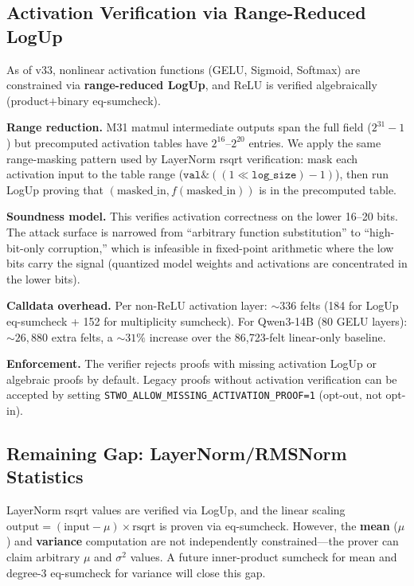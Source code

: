 \documentclass[10pt,twocolumn]{article}
\theoremstyle{definition}
\theoremstyle{remark}
\begin{document}
\subsection{Activation Verification via Range-Reduced LogUp}

As of v33, nonlinear activation functions (GELU, Sigmoid, Softmax)
are constrained via \textbf{range-reduced LogUp}, and ReLU is
verified algebraically (product$+$binary eq-sumcheck).

\textbf{Range reduction.}
M31 matmul intermediate outputs span the full field ($2^{31}\!-\!1$)
but precomputed activation tables have $2^{16}$--$2^{20}$ entries.
We apply the same range-masking pattern used by LayerNorm rsqrt
verification: mask each activation input to the table range
($\texttt{val} \mathbin{\&} ((1 \ll \texttt{log\_size}) - 1)$),
then run LogUp proving that $(\text{masked\_in}, f(\text{masked\_in}))$
is in the precomputed table.

\textbf{Soundness model.}
This verifies activation correctness on the lower 16--20 bits.
The attack surface is narrowed from ``arbitrary function substitution''
to ``high-bit-only corruption,'' which is infeasible in fixed-point
arithmetic where the low bits carry the signal (quantized model
weights and activations are concentrated in the lower bits).

\textbf{Calldata overhead.}
Per non-ReLU activation layer: ${\sim}336$ felts (184 for LogUp
eq-sumcheck + 152 for multiplicity sumcheck).
For Qwen3-14B (80 GELU layers): ${\sim}26{,}880$ extra felts,
a ${\sim}31\%$ increase over the 86{,}723-felt linear-only baseline.

\textbf{Enforcement.}
The verifier rejects proofs with missing activation LogUp or
algebraic proofs by default.
Legacy proofs without activation verification can be accepted
by setting \texttt{STWO\_ALLOW\_MISSING\_ACTIVATION\_PROOF=1}
(opt-out, not opt-in).

\subsection{Remaining Gap: LayerNorm/RMSNorm Statistics}

LayerNorm rsqrt values are verified via LogUp, and the linear
scaling $\text{output} = (\text{input} - \mu) \times \text{rsqrt}$
is proven via eq-sumcheck.
However, the \textbf{mean} ($\mu$) and \textbf{variance}
computation are not independently constrained---the prover
can claim arbitrary $\mu$ and $\sigma^2$ values.
A future inner-product sumcheck for mean and degree-3 eq-sumcheck
for variance will close this gap.
\end{document}
